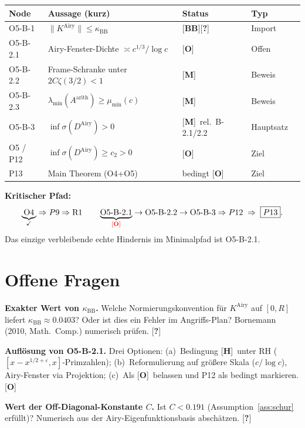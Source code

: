 \documentclass[12pt,a4paper]{amsart}
\newcommand{\statusM}{{\color{green!60!black}[\textbf{M}]}}
\newcommand{\statusO}{{\color{red}[\textbf{O}]}}
\newcommand{\statusH}{{\color{orange}[\textbf{H}]}}
\newcommand{\statusBB}{{\color{blue}[\textbf{BB}]}}
\newcommand{\statusQ}{{\color{red}[\textbf{?}]}}
\theoremstyle{definition}
\newcommand{\KAiry}{K^{\mathrm{Airy}}}
\newcommand{\Aarith}{A^{\mathrm{arith}}}
\newcommand{\DAiry}{D^{\mathrm{Airy}}}
\newcommand{\kappaBB}{\kappa_{\mathrm{BB}}}
\newcommand{\norm}[1]{\lVert #1 \rVert}
\begin{document}
\begin{center}
\renewcommand{\arraystretch}{1.4}
\begin{tabular}{lllll}
\toprule
\textbf{Node} & \textbf{Aussage (kurz)} & \textbf{Status} & \textbf{Typ} \\
\midrule
O5-B-1    & $\norm{\KAiry} \le \kappaBB$                     & \statusBB\statusQ & Import \\
O5-B-2.1  & Airy-Fenster-Dichte $\asymp c^{1/3}/\log c$     & \statusO         & Offen  \\
O5-B-2.2  & Frame-Schranke unter $2C\zeta(3/2)<1$            & \statusM         & Beweis \\
O5-B-2.3  & $\lambda_{\min}(\Aarith) \ge \mu_{\min}(c)$     & \statusM         & Beweis \\
O5-B-3    & $\inf\sigma(\DAiry) > 0$                         & \statusM\ rel.\ B-2.1/2.2 & Hauptsatz \\
\midrule
O5 / P12  & $\inf\sigma(\DAiry) \ge c_2 > 0$                 & \statusO         & Ziel   \\
P13       & Main Theorem (O4+O5)                              & bedingt \statusO  & Ziel   \\
\bottomrule
\end{tabular}
\end{center}

\medskip
\noindent\textbf{Kritischer Pfad:}
\[
  \underbrace{\text{O4}}_{\checkmark}
  \Rightarrow P9 \Rightarrow \text{R1}
  \qquad
  \underbrace{\text{O5-B-2.1}}_{\statusO}
  \to \text{O5-B-2.2} \to \text{O5-B-3}
  \Rightarrow P12
  \;\Rightarrow\; \boxed{P13}.
\]
Das einzige verbleibende echte Hindernis im Minimalpfad ist O5-B-2.1.

\section{Offene Fragen}
\label{sec:open}

\begin{enumerate}[label={[O-O5B3-\arabic*]},ref={O-O5B3-\arabic*}]

\item\label{oq:kappaBB_exact}
\textbf{Exakter Wert von $\kappaBB$.}
Welche Normierungskonvention für $\KAiry$ auf $[0,R]$ liefert
$\kappaBB \approx 0.0403$? Oder ist dies ein Fehler im Angriffs-Plan?
Bornemann (2010, Math.\ Comp.) numerisch prüfen.
\statusQ

\item\label{oq:O5B21_resolution}
\textbf{Auflösung von O5-B-2.1.}
Drei Optionen:
(a)~Bedingung \statusH\ unter RH ($[x-x^{1/2+\varepsilon},x]$-Primzahlen);
(b)~Reformulierung auf größere Skala ($c/\log c$), Airy-Fenster via Projektion;
(c)~Als \statusO\ belassen und P12 als bedingt markieren.
\statusO

\item\label{oq:C_value}
\textbf{Wert der Off-Diagonal-Konstante $C$.}
Ist $C < 0.191$ (Assumption~\ref{ass:schur} erfüllt)?
Numerisch aus der Airy-Eigenfunktionsbasis abschätzen.
\statusQ

\end{enumerate}
\end{document}
